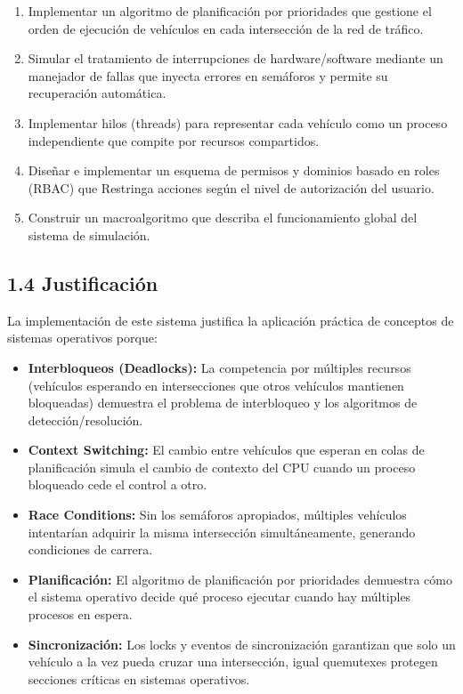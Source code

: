 \documentclass[12pt,a4paper]{article}
\begin{document}
\begin{enumerate}
    \item Implementar un algoritmo de planificación por prioridades que gestione el orden de ejecución de vehículos en cada intersección de la red de tráfico.
    \item Simular el tratamiento de interrupciones de hardware/software mediante un manejador de fallas que inyecta errores en semáforos y permite su recuperación automática.
    \item Implementar hilos (threads) para representar cada vehículo como un proceso independiente que compite por recursos compartidos.
    \item Diseñar e implementar un esquema de permisos y dominios basado en roles (RBAC) que Restringa acciones según el nivel de autorización del usuario.
    \item Construir un macroalgoritmo que describa el funcionamiento global del sistema de simulación.
\end{enumerate}

\subsection{1.4 Justificación}

La implementación de este sistema justifica la aplicación práctica de conceptos de sistemas operativos porque:

\begin{itemize}
    \item \textbf{Interbloqueos (Deadlocks):} La competencia por múltiples recursos (vehículos esperando en intersecciones que otros vehículos mantienen bloqueadas) demuestra el problema de interbloqueo y los algoritmos de detección/resolución.
    \item \textbf{Context Switching:} El cambio entre vehículos que esperan en colas de planificación simula el cambio de contexto del CPU cuando un proceso bloqueado cede el control a otro.
    \item \textbf{Race Conditions:} Sin los semáforos apropiados, múltiples vehículos intentarían adquirir la misma intersección simultáneamente, generando condiciones de carrera.
    \item \textbf{Planificación:} El algoritmo de planificación por prioridades demuestra cómo el sistema operativo decide qué proceso ejecutar cuando hay múltiples procesos en espera.
    \item \textbf{Sincronización:} Los locks y eventos de sincronización garantizan que solo un vehículo a la vez pueda cruzar una intersección, igual quemutexes protegen secciones críticas en sistemas operativos.
\end{itemize}
\end{document}
